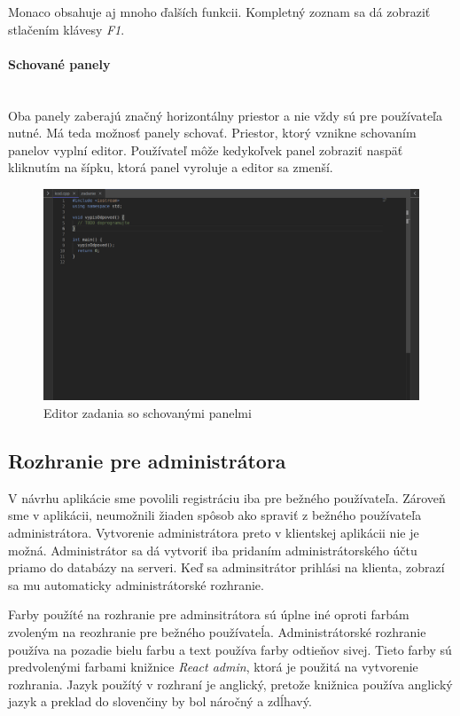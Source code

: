 Monaco obsahuje aj mnoho ďalších funkcii. Kompletný zoznam sa dá zobraziť stlačením klávesy
\textit{F1}. 

\paragraph{Schované panely}\leavevmode\\
Oba panely zaberajú značný horizontálny priestor a nie vždy sú pre používateľa nutné. Má teda
možnosť panely schovať. Priestor, ktorý vznikne schovaním panelov vyplní editor. Používateľ môže
kedykoľvek panel zobraziť naspäť kliknutím na šípku, ktorá panel vyroluje a editor sa zmenší. 
\begin{figure}[H]
\centerline{\includegraphics[width=1\textwidth]{images/zcucnute_panely}}
\caption[Editor zadania so schovanými panelmi]{Editor zadania so schovanými panelmi}
\label{obr:zcucnute_panely}
\end{figure}

\subsection{Rozhranie pre administrátora}
V návrhu aplikácie sme povolili registráciu iba pre bežného používateľa. Zároveň sme v aplikácii,
neumožnili žiaden spôsob ako spraviť z bežného používateľa administrátora. Vytvorenie administrátora
preto v klientskej aplikácii nie je možná. Administrátor sa dá vytvoriť iba pridaním
administrátorského účtu priamo do databázy na serveri. Keď sa adminsitrátor prihlási na klienta, 
zobrazí sa mu automaticky administrátorské rozhranie.

Farby použíté na rozhranie pre adminsitrátora sú úplne iné oproti farbám zvoleným na reozhranie pre
bežného používateĺa. Administrátorské rozhranie používa na pozadie bielu farbu a text používa farby
odtieňov sivej. Tieto farby sú predvolenými farbami knižnice \textit{React admin}, ktorá je použitá
na vytvorenie rozhrania. Jazyk použítý v rozhraní je anglický, pretože knižnica používa anglický
jazyk a preklad do slovenčiny by bol náročný a zdĺhavý.


